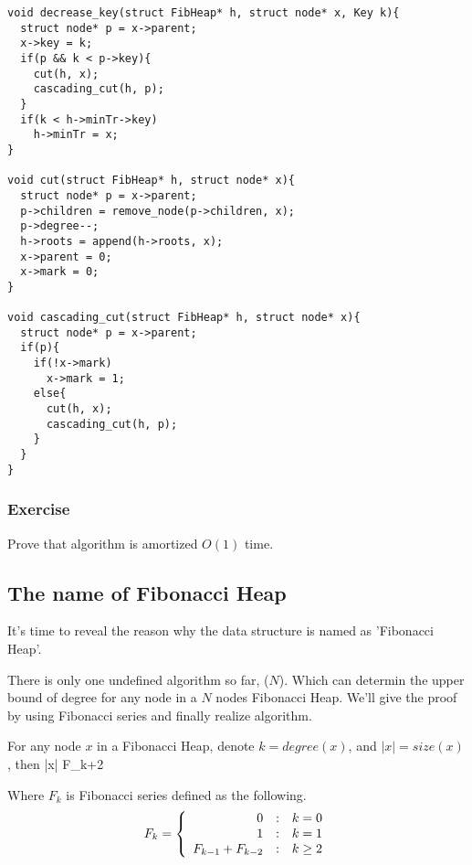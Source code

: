 \documentclass{article}
\begin{document}
\lstset{language=C}
\begin{lstlisting}
void decrease_key(struct FibHeap* h, struct node* x, Key k){
  struct node* p = x->parent;
  x->key = k;
  if(p && k < p->key){
    cut(h, x);
    cascading_cut(h, p);
  }
  if(k < h->minTr->key)
    h->minTr = x;
}

void cut(struct FibHeap* h, struct node* x){
  struct node* p = x->parent;
  p->children = remove_node(p->children, x);
  p->degree--;
  h->roots = append(h->roots, x);
  x->parent = 0;
  x->mark = 0;
}

void cascading_cut(struct FibHeap* h, struct node* x){
  struct node* p = x->parent;
  if(p){
    if(!x->mark)
      x->mark = 1;
    else{
      cut(h, x);
      cascading_cut(h, p);
    }
  }
}
\end{lstlisting}

\subsubsection*{Exercise}
Prove that  algorithm is amortized $O(1)$ time.

\subsection{The name of Fibonacci Heap}
It's time to reveal the reason why the data structure is named
as 'Fibonacci Heap'.

There is only one undefined algorithm so far, ($N$).
Which can determin the upper bound of degree for any node in a $N$ nodes 
Fibonacci Heap. We'll give the proof by using Fibonacci series and
finally realize  algorithm.

\begin{lemma}
\label{lemma:Fib-degree}
For any node $x$ in a Fibonacci Heap, denote $k = degree(x)$, and
$|x| = size(x)$, then
\be
  |x| \geq F_{k+2}
\ee

Where $F_k$ is Fibonacci series defined as the following.
\[
F_k = \left \{
  \begin{array}
  {r@{\quad:\quad}l}
  0 & k = 0 \\
  1 & k = 1 \\
  F_{k-1} + F_{k-2} & k \geq 2 
  \end{array}
\right.
\]
\end{lemma}
\end{document}
